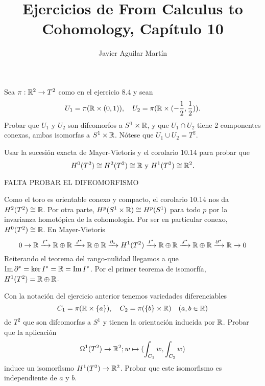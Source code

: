 \documentclass[twoside]{article}
\begin{document}
\title{Ejercicios de From Calculus to Cohomology, Capítulo 10}
\author{Javier Aguilar Martín}
\maketitle

\begin{ejercicio}{10.1}
Sea $\pi:\mathbb{R}^2\to T^2$ como en el ejercicio 8.4 y sean
\[
U_1=\pi(\mathbb{R}\times (0,1)),\quad U_2=\pi(\mathbb{R}\times (-\frac{1}{2},\frac{1}{2})).
\]
Probar que $U_1$ y $U_2$ son difeomorfos a $S^1\times\mathbb{R}$, y que $U_1\cap U_2$ tiene 2 componentes conexas, ambas isomorfas a $S^1\times\mathbb{R}$. Nótese que $U_1\cup U_2=T^2$.

Usar la sucesión exacta de Mayer-Vietoris y el corolario 10.14 para probar que
\[
H^0(T^2)\cong H^2(T^2)\cong\mathbb{R}\text{ y }H^1(T^2)\cong\mathbb{R}^2.
\]
\end{ejercicio}
\begin{solucion}
FALTA PROBAR EL DIFEOMORFISMO

Como el toro es orientable conexo y compacto, el corolario 10.14 nos da $H^2(T^2)\cong\mathbb{R}$. Por otra parte, $H^p(S^1\times\mathbb{R})\cong H^p(S^1)$ para todo $p$ por la invarianza homotópica de la cohomología. Por ser en particular conexo, $H^0(T^2)\cong\mathbb{R}$. En Mayer-Vietoris
\[
0\to\mathbb{R}\xrightarrow{I^*}\mathbb{R}\oplus\mathbb{R}\xrightarrow{J^*}\mathbb{R}\oplus\mathbb{R}\xrightarrow{\partial_*}H^1(T^2)\xrightarrow{I^*}\mathbb{R}\oplus\mathbb{R}\xrightarrow{J^*}\mathbb{R}\oplus\mathbb{R}\xrightarrow{\partial^*}\mathbb{R}\xrightarrow{} 0
\]
Reiterando el teorema del rango-nulidad llegamos a que $\operatorname{Im}{\partial^*}=\ker{I^*}=\mathbb{R}=\operatorname{Im}{I^*}$. Por el primer teorema de isomorfía, $H^1(T^2)=\mathbb{R}\oplus\mathbb{R}$. 

\end{solucion}
\newpage


\begin{ejercicio}{10.2}
Con la notación del ejercicio anterior tenemos variedades diferenciables
\[
C_1=\pi(\mathbb{R}\times\{a\}),\quad C_2=\pi(\{b\}\times\mathbb{R})\quad (a,b\in\mathbb{R})
\]
de $T^2$ que son difeomorfas a $S^1$ y tienen la orientación inducida por $\mathbb{R}$. Probar que la aplicación
\[
\Omega^1(T^2)\to\mathbb{R}^2; w\mapsto (\int_{C_1}w, \int_{C_2}w)
\]
induce un isomorfismo $H^1(T^2)\to \mathbb{R}^2$. Probar que este isomorfismo es independiente de $a$ y $b$.
\end{ejercicio}
\begin{solucion}

\end{solucion}
\newpage
\end{document}
